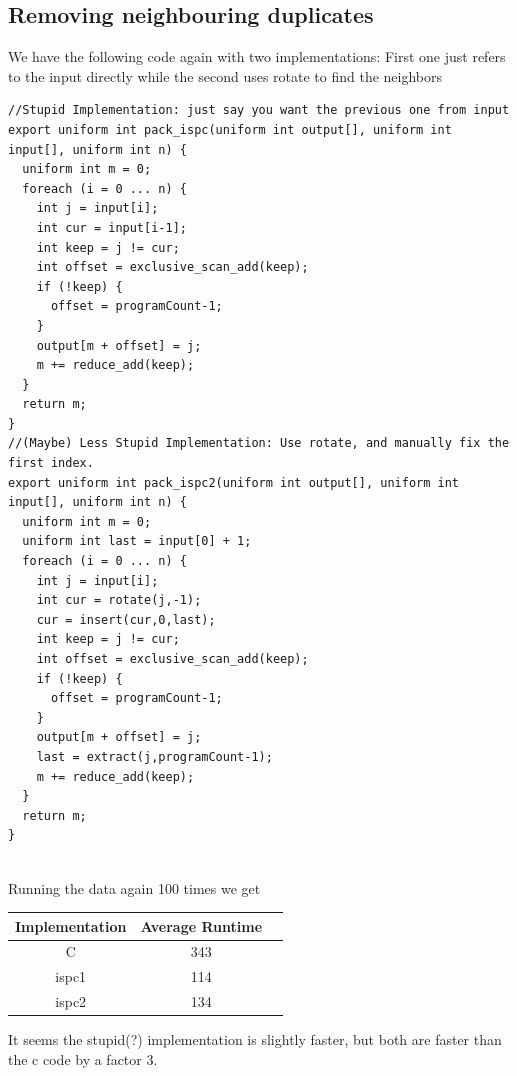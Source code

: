 \documentclass[a4paper,12pt]{article}
\begin{document}
\subsection{Removing neighbouring duplicates}
We have the following code again with two implementations: First one just
refers to the input directly while the second uses rotate to find the
neighbors
\begin{lstlisting}
//Stupid Implementation: just say you want the previous one from input
export uniform int pack_ispc(uniform int output[], uniform int input[], uniform int n) {
  uniform int m = 0;
  foreach (i = 0 ... n) {
    int j = input[i];
    int cur = input[i-1];
    int keep = j != cur;
    int offset = exclusive_scan_add(keep);
    if (!keep) {
      offset = programCount-1;
    }
    output[m + offset] = j;
    m += reduce_add(keep);
  }
  return m;
}
//(Maybe) Less Stupid Implementation: Use rotate, and manually fix the first index.
export uniform int pack_ispc2(uniform int output[], uniform int input[], uniform int n) {
  uniform int m = 0;
  uniform int last = input[0] + 1;
  foreach (i = 0 ... n) {
    int j = input[i];
    int cur = rotate(j,-1);
    cur = insert(cur,0,last);
    int keep = j != cur;
    int offset = exclusive_scan_add(keep);
    if (!keep) {
      offset = programCount-1;
    }
    output[m + offset] = j;
    last = extract(j,programCount-1);
    m += reduce_add(keep);
  }
  return m;
}
    
\end{lstlisting}
Running the data again 100 times we get
\begin{center}
	\begin{tabular}{ |c|c|c| }
		\hline
		Implementation & Average Runtime \\
		\hline
		C              & 343             \\
		ispc1          & 114             \\
		ispc2          & 134             \\
		\hline
	\end{tabular}
\end{center}
It seems the stupid(?) implementation is slightly faster, but both are
faster than the c code by a factor 3.
\end{document}
